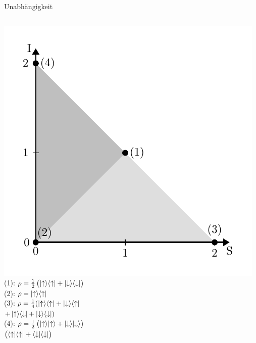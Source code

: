 \begin{frame}{Unabhängigkeit}
\begin{columns}
		\begin{column}{0.55\textwidth}
			\centering
			\includegraphics[scale=0.65]{graphics/presentation_qm.pdf}\,\cite{Tegmark_15_long}
			\footnotesize
			(1): $\rho = \frac{1}{2} \del{\ketup\!\braup + \ketdown\!\bradown}$\\
			\hspace{-1.65cm}(2): $\rho = \ket{\uparrow}\!\bra{\uparrow}$\\
			\hspace{-.2cm}(3): $\rho = \frac{1}{4} (\ket{\uparrow}\!\bra{\uparrow} + \ket{\downarrow}\!\bra{\uparrow}$\\\qquad\qquad $+ \ket{\uparrow}\!\bra{\downarrow} + \ket{\downarrow}\!\bra{\downarrow})$\\
			(4): $\rho = \frac{1}{2} \del{\ketup\!\ketup + \ketdown\!\ketdown}$ \\\qquad\qquad$\del{\braup\!\braup + \bradown\!\bradown} $\\
		\end{column}		
	\end{columns}
\end{frame}
